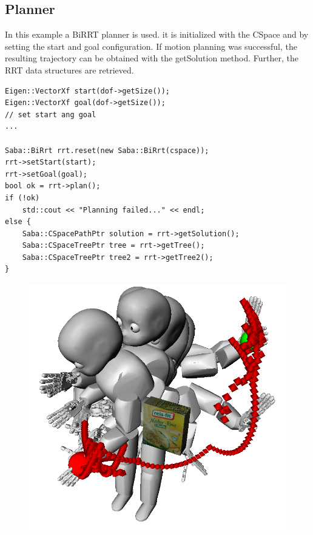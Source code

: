 \documentclass{book}
\begin{document}
\subsection{Planner}
In this example a BiRRT planner is used. it is initialized with the CSpace and by setting the start and goal configuration. If motion planning was successful, the resulting trajectory can be obtained with the getSolution method. Further, the RRT data structures are retrieved. 
\begin{lstlisting}
Eigen::VectorXf start(dof->getSize());
Eigen::VectorXf goal(dof->getSize());
// set start ang goal
...

Saba::BiRrt rrt.reset(new Saba::BiRrt(cspace));
rrt->setStart(start);
rrt->setGoal(goal);
bool ok = rrt->plan();
if (!ok)
    std::cout << "Planning failed..." << endl;
else {
    Saba::CSpacePathPtr solution = rrt->getSolution();
    Saba::CSpaceTreePtr tree = rrt->getTree();
    Saba::CSpaceTreePtr tree2 = rrt->getTree2();
}
\end{lstlisting}
\begin{figure}[H]
	\centering
	\includegraphics[scale = 0.3]{PlanningBiRrt1}
\end{figure}
\end{document}
